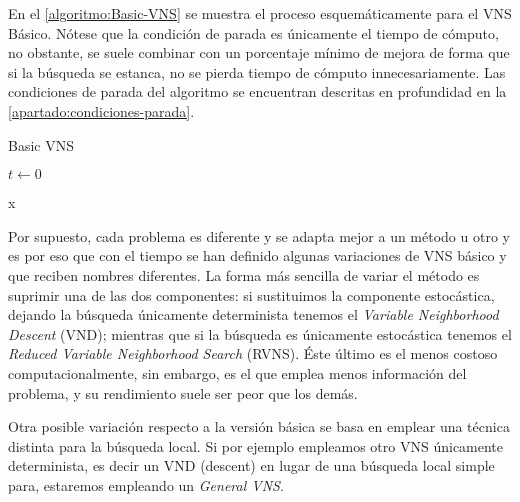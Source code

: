 En el \autoref{algoritmo:Basic-VNS} se muestra el proceso esquemáticamente para el VNS Básico. Nótese que la condición de parada es únicamente el tiempo de cómputo, no obstante, se suele combinar con un porcentaje mínimo de mejora de forma que si la búsqueda se estanca, no se pierda tiempo de cómputo innecesariamente. Las condiciones de parada del algoritmo se encuentran descritas en profundidad en la \autoref{apartado:condiciones-parada}.

\begin{algorithm}[htbp]
	\caption{Basic VNS~\cite{vns}}
	\label{algoritmo:Basic-VNS}
	
	\DontPrintSemicolon

	\bigskip
	
	$t \leftarrow 0$ \;
	
	
	\Return x \;
	
\end{algorithm}

Por supuesto, cada problema es diferente y se adapta mejor a un método u otro y es por eso que con el tiempo se han definido algunas variaciones de VNS básico y que reciben nombres diferentes. La forma más sencilla de variar el método es suprimir una de las dos componentes: si sustituimos la componente estocástica, dejando la búsqueda únicamente determinista tenemos el \textit{Variable Neighborhood Descent} (VND); mientras que si la búsqueda es únicamente estocástica tenemos el \textit{Reduced Variable Neighborhood Search} (RVNS). Éste último es el menos costoso computacionalmente, sin embargo, es el que emplea menos información del problema, y su rendimiento suele ser peor que los demás.

Otra posible variación respecto a la versión básica se basa en emplear una técnica distinta para la búsqueda local. Si por ejemplo empleamos otro VNS únicamente determinista, es decir un VND (descent) en lugar de una búsqueda local simple para, estaremos empleando un \textit{General VNS}.

